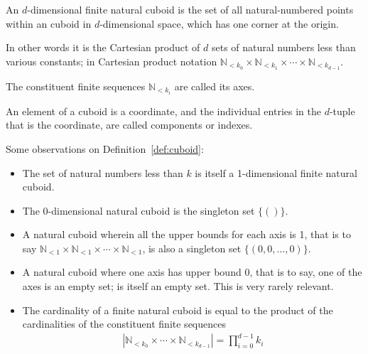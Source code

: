 \documentclass{DIKU-report-variant}
\newcommand\Nat{\mathbb{N}}
\begin{document}
\begin{definition}
  \label{def:cuboid}
  An \(d\)-dimensional finite natural cuboid is the set of all natural-numbered points
  within an cuboid in \(d\)-dimensional space, which has one corner at the origin.

  In other words it is the Cartesian product of \(d\) sets of natural numbers
  less than various constants; in Cartesian product notation
  \(\Nat_{<k_0} \times \Nat_{<k_1} \times \cdots \times \Nat_{<k_{d-1}}\).

  The constituent finite sequences \(\Nat_{<k_i}\) are called its axes.

  An element of a cuboid is a coordinate, and the individual entries in
  the \(d\)-tuple that is the coordinate, are called components or indexes.
\end{definition}
\begin{observation}
  \label{ob:cuboid}
  Some observations on Definition~\ref{def:cuboid}:
  \begin{itemize}
    \item The set of natural numbers less than \(k\) is itself a 1-dimensional finite natural cuboid.
    \item The 0-dimensional natural cuboid is the singleton set \(\{()\}\).
    \item A natural cuboid wherein all the upper bounds for each axis is 1, that
      is to say \(\Nat_{<1} \times \Nat_{<1} \times \cdots \times \Nat_{<1}\), is
      also a singleton set \(\{(0, 0, \dots, 0)\}\).
    \item A natural cuboid where one axis has upper bound 0, that is to
      say, one of the axes is an empty set; is itself an empty set. This is very rarely relevant.
    \item The cardinality of a finite natural cuboid is equal to the product of
      the cardinalities of the constituent finite sequences
      \begin{align*}
      |\Nat_{<k_0} \times \cdots \times \Nat_{<k_{d-1}}| = \prod_{i=0}^{d-1} k_i
      \end{align*}
  \end{itemize}
\end{observation}
\end{document}
